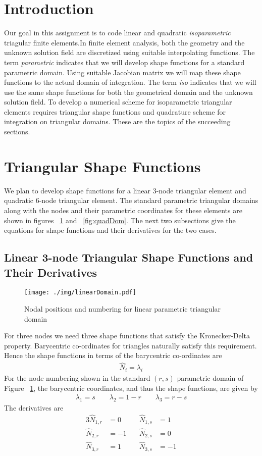 \documentclass[../main.tex]{subfiles}
\begin{document}
\lstset{language=Matlab}
\section*{Introduction}
Our goal in this assignment is to code linear and quadratic
\textit{isoparametric} triagular finite elements.In finite element
analysis, both the geometry and the unknown solution field are
discretized using suitable interpolating functions. The term
\textit{parametric} indicates that we will develop shape functions for
a standard parametric domain. Using suitable Jacobian matrix we will
map these shape functions to the actual domain of integration. The
term \textit{iso} indicates that we will use the same shape functions
for both the geometrical domain and the unknown solution field. To
develop a numerical scheme for isoparametric triangular elements
requires triangular shape functions and quadrature scheme for
integration on triangular domains. These are the topics of the
succeeding sections.

\section*{Triangular Shape Functions}
We plan to develop shape functions for a linear 3-node triangular
element and quadratic 6-node triangular element. The standard
parametric triangular domains along with the nodes and their
parametric coordinates for these elements are shown in figures
~\ref{fig:linDom} and ~\ref{fig:quadDom}. The next two subsections
give the equations for shape functions and their derivatives for the
two cases.
\subsection*{Linear 3-node Triangular Shape Functions and Their
  Derivatives}
\begin{figure}[h]
  \centering
  \texttt{[image: ./img/linearDomain.pdf]}
  \caption{Nodal positions and numbering for linear parametric
    triangular domain}
  \label{fig:linDom}
\end{figure}
For three nodes we need three shape functions that satisfy the
Kronecker-Delta property. Barycentric co-ordinates for triangles
naturally satisfy this requirement. Hence the shape functions in terms
of the barycentric co-ordinates are
\begin{align*}
  \hat{N}_i = \lambda_i
\end{align*}
For the node numbering shown in the standard $(r,s)$ parametric domain
of Figure ~\ref{fig:linDom}, the barycentric coordinates, and thus the
shape functions, are given by
\begin{align}
  \label{eq:bary}
  \lambda_1 = s \qquad \lambda_2 = 1-r \qquad \lambda_3 = r-s
\end{align}
The derivatives are
\begin{alignat*}{3}
  \hat{N}_{1,r} &= 0 &\quad\hat{N}_{1,s} &= 1 \\
  \hat{N}_{2,r} &= -1& \quad\hat{N}_{2,s}&= 0 \\
  \hat{N}_{3,r} &= 1 & \quad\hat{N}_{3,s}&= -1
\end{alignat*}
\end{document}
